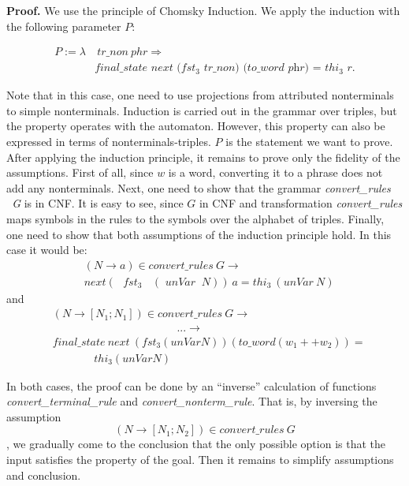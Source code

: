 \textbf{Proof.} 
We use the principle of Chomsky Induction.
We apply the induction with the following parameter $P$:

\begin{align*}
P :=  \lambda & \ \textit{tr\_non} \ phr \Rightarrow  \\
              & \textit{final\_state} \textit{\ next \ ($fst_3$ tr\_non) (to\_word \ phr) = $thi_3$ r}. 
\end{align*}

Note that in this case, one need to use projections from attributed nonterminals to simple nonterminals. Induction is carried out in the grammar over triples, but the property operates with the automaton. However, this property can also be expressed in terms of nonterminals-triples.
$P$ is the statement we want to prove.
After applying the induction principle, it remains to prove only the fidelity of the assumptions.
First of all, since $ w $ is a word, converting it to a phrase does not add any nonterminals.
Next, one need to show that the grammar \textit{convert\_rules \ G} is in CNF. It is easy to see, since $G$ in CNF and transformation \textit{convert\_rules} maps symbols in the rules to the symbols over the alphabet of triples.
Finally, one need to show that both assumptions of the induction principle hold.  
In this case it would be: 
\begin{align*}
& (N \to a) \in \textit{convert\_rules} \ G \to \ \ \ \ \ \ \ \ \ \ \ \ \ \ \ \ \ \ \ \ \ \ \ \\
& next (\textit{ $fst_{3}$ } \ (\textit{ unVar } \ N)) \ a = \textit{$thi_3$} \ (\textit{unVar} \ N) 
\end{align*}
and 
\begin{align*}
& (N \to [N_1; N_1]) \in \textit{convert\_rules} \ G  \to \\
& \ \ \ \ \ \ \ \ \ \ \ \ \ \ \ \ \ \ \ \ \ \ \ \ \ \ \ \ \ \ \ \ \ \ \ \ \ \ \ \ \ \ \ \ \ \ \ \ \ \ \ ... \to \\
& \textit{final\_state} \ \textit{next} \ (fst_3 (unVar N)) (to\_word (w_1 ++ w_2)) = \\
& \ \ \ \ \ \ \ \ \ \ \ \ \ \ \ \ \ thi_3 (unVar N)
\end{align*}

In both cases, the proof can be done by an ``inverse'' calculation of functions \textit{convert\_terminal\_rule} and \textit{convert\_nonterm\_rule}. 
That is, by inversing the assumption $$ (N \to [N_1; N_2]) \in \textit{convert\_rules} \ G$$, we gradually come to the conclusion that the only possible option is that the input satisfies the property of the goal. Then it remains to simplify assumptions and conclusion.


